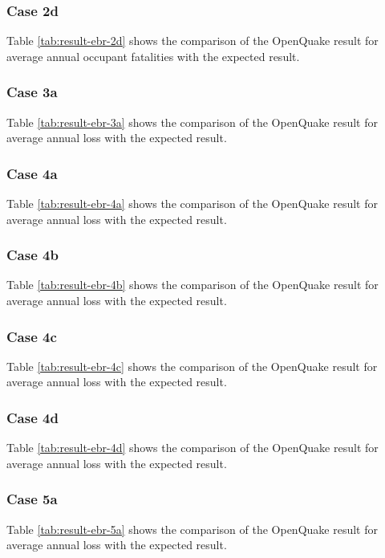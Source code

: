 \subsubsection{Case 2d}


Table \ref{tab:result-ebr-2d} shows the comparison of the OpenQuake result for average annual occupant fatalities with the expected result.

\subsubsection{Case 3a}


Table \ref{tab:result-ebr-3a} shows the comparison of the OpenQuake result for average annual loss with the expected result.

\subsubsection{Case 4a}


Table \ref{tab:result-ebr-4a} shows the comparison of the OpenQuake result for average annual loss with the expected result.

\subsubsection{Case 4b}


Table \ref{tab:result-ebr-4b} shows the comparison of the OpenQuake result for average annual loss with the expected result.

\subsubsection{Case 4c}


Table \ref{tab:result-ebr-4c} shows the comparison of the OpenQuake result for average annual loss with the expected result.

\subsubsection{Case 4d}


Table \ref{tab:result-ebr-4d} shows the comparison of the OpenQuake result for average annual loss with the expected result.

\subsubsection{Case 5a}


Table \ref{tab:result-ebr-5a} shows the comparison of the OpenQuake result for average annual loss with the expected result.

